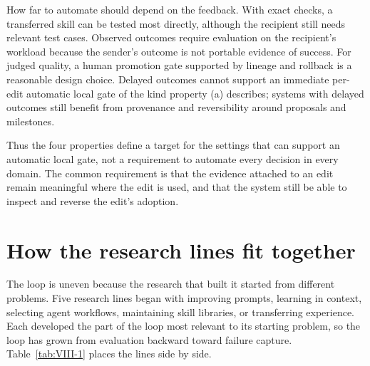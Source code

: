 \documentclass[
  11pt,
]{article}
\begin{document}
How far to automate should depend on the feedback. With exact checks, a transferred skill can be tested most directly, although the recipient still needs relevant test cases. Observed outcomes require evaluation on the recipient's workload because the sender's outcome is not portable evidence of success. For judged quality, a human promotion gate supported by lineage and rollback is a reasonable design choice. Delayed outcomes cannot support an immediate per-edit automatic local gate of the kind property (a) describes; systems with delayed outcomes still benefit from provenance and reversibility around proposals and milestones.

Thus the four properties define a target for the settings that can support an automatic local gate, not a requirement to automate every decision in every domain. The common requirement is that the evidence attached to an edit remain meaningful where the edit is used, and that the system still be able to inspect and reverse the edit's adoption.

\section{How the research lines fit together}\label{sec:families}

The loop is uneven because the research that built it started from different problems. Five research lines began with improving prompts, learning in context, selecting agent workflows, maintaining skill libraries, or transferring experience. Each developed the part of the loop most relevant to its starting problem, so the loop has grown from evaluation backward toward failure capture. Table~\ref{tab:VIII-1} places the lines side by side.
\end{document}
